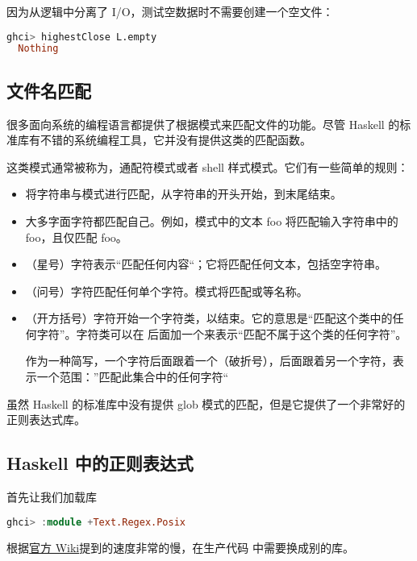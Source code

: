 \documentclass[./main.tex]{subfiles}
\begin{document}
因为从逻辑中分离了 I/O，测试空数据时不需要创建一个空文件：

\begin{lstlisting}[language=Haskell]
  ghci> highestClose L.empty
  Nothing
\end{lstlisting}

\subsection*{文件名匹配}

很多面向系统的编程语言都提供了根据模式来匹配文件的功能。尽管 Haskell 的标准库有不错的系统编程工具，它并没有提供这类的匹配函数。

这类模式通常被称为，通配符模式或者 shell 样式模式。它们有一些简单的规则：

\begin{itemize}
  \item 将字符串与模式进行匹配，从字符串的开头开始，到末尾结束。
  \item 大多字面字符都匹配自己。例如，模式中的文本 foo 将匹配输入字符串中的 foo，且仅匹配 foo。
  \item \acode{*}（星号）字符表示“匹配任何内容“；它将匹配任何文本，包括空字符串。
  \item {}（问号）字符匹配任何单个字符。模式将匹配或等名称。
  \item \acode{[}（开方括号）字符开始一个字符类，以\acode{]}结束。它的意思是“匹配这个类中的任何字符”。字符类可以在\acode{[}
        后面加一个\acode{!}来表示“匹配不属于这个类的任何字符”。

        作为一种简写，一个字符后面跟着一个\acode{-}（破折号），后面跟着另一个字符，表示一个范围：”匹配此集合中的任何字符“
\end{itemize}

虽然 Haskell 的标准库中没有提供 glob 模式的匹配，但是它提供了一个非常好的正则表达式库。

\subsection*{Haskell 中的正则表达式}

首先让我们加载库

\begin{lstlisting}[language=Haskell]
  ghci> :module +Text.Regex.Posix
\end{lstlisting}

根据\href{https://wiki.haskell.org/Regular_expressions}{官方 Wiki}提到的速度非常的慢，在生产代码
中需要换成别的库。
\end{document}
